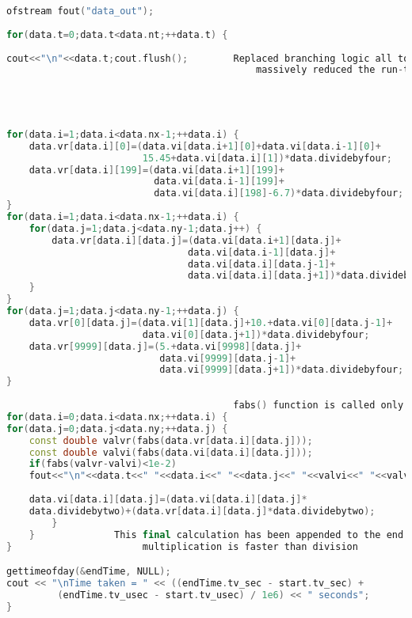 \documentclass[10pt]{report}
\begin{document}
\begin{lstlisting}[language=C++, caption=Optimized code listing]
ofstream fout("data_out");
                
for(data.t=0;data.t<data.nt;++data.t) {                                               
                                                                                
cout<<"\n"<<data.t;cout.flush();        Replaced branching logic all together                                     
                                            massively reduced the run-time.




for(data.i=1;data.i<data.nx-1;++data.i) {                               
    data.vr[data.i][0]=(data.vi[data.i+1][0]+data.vi[data.i-1][0]+      
                        15.45+data.vi[data.i][1])*data.dividebyfour;
    data.vr[data.i][199]=(data.vi[data.i+1][199]+
                          data.vi[data.i-1][199]+
                          data.vi[data.i][198]-6.7)*data.dividebyfour;
}
for(data.i=1;data.i<data.nx-1;++data.i) {
    for(data.j=1;data.j<data.ny-1;data.j++) {
        data.vr[data.i][data.j]=(data.vi[data.i+1][data.j]+
                                data.vi[data.i-1][data.j]+
                                data.vi[data.i][data.j-1]+
                                data.vi[data.i][data.j+1])*data.dividebyfour;
    }
}
for(data.j=1;data.j<data.ny-1;++data.j) {
    data.vr[0][data.j]=(data.vi[1][data.j]+10.+data.vi[0][data.j-1]+
                        data.vi[0][data.j+1])*data.dividebyfour;
    data.vr[9999][data.j]=(5.+data.vi[9998][data.j]+
                           data.vi[9999][data.j-1]+
                           data.vi[9999][data.j+1])*data.dividebyfour;
}
                
                                        fabs() function is called only once 
for(data.i=0;data.i<data.nx;++data.i) {
for(data.j=0;data.j<data.ny;++data.j) {                                 
    const double valvr(fabs(data.vr[data.i][data.j]));  
    const double valvi(fabs(data.vi[data.i][data.j]));
    if(fabs(valvr-valvi)<1e-2) 
    fout<<"\n"<<data.t<<" "<<data.i<<" "<<data.j<<" "<<valvi<<" "<<valvr;
 
    data.vi[data.i][data.j]=(data.vi[data.i][data.j]*   
    data.dividebytwo)+(data.vr[data.i][data.j]*data.dividebytwo);  
        }       
    }              This final calculation has been appended to the end of this loop
}                       multiplication is faster than division

gettimeofday(&endTime, NULL);
cout << "\nTime taken = " << ((endTime.tv_sec - start.tv_sec) +
         (endTime.tv_usec - start.tv_usec) / 1e6) << " seconds";
}
\end{lstlisting}
\end{document}

